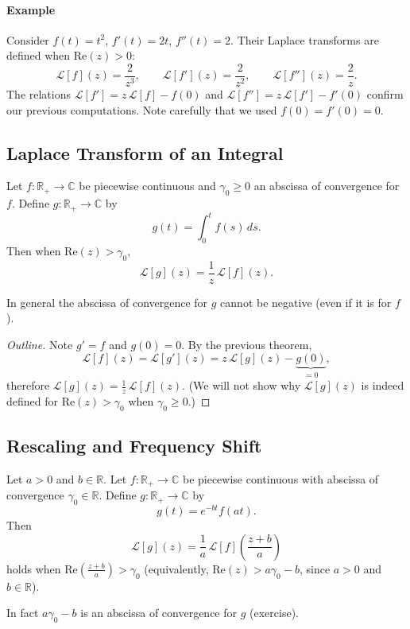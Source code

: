 \paragraph{Example}
\begin{example}
Consider $f(t) = t^2$, $f'(t) = 2t$, $f''(t) = 2$. Their Laplace transforms are defined when $\mathrm{Re}(z) > 0$:
\[
\mathcal{L}[f](z) = \frac{2}{z^3}, \qquad
\mathcal{L}[f'](z) = \frac{2}{z^2}, \qquad
\mathcal{L}[f''](z) = \frac{2}{z}.
\]
The relations $\mathcal{L}[f'] = z\,\mathcal{L}[f] - f(0)$ and $\mathcal{L}[f''] = z\,\mathcal{L}[f'] - f'(0)$ confirm our previous computations. Note carefully that we used $f(0) = f'(0) = 0$.
\end{example}

\subsection{Laplace Transform of an Integral}

\begin{theorem}
Let $f : \mathbb{R}_+ \to \mathbb{C}$ be piecewise continuous and $\gamma_0 \geq 0$ an abscissa of convergence for $f$. Define $g : \mathbb{R}_+ \to \mathbb{C}$ by
\[
g(t) = \int_0^t f(s)\,ds.
\]
Then when $\mathrm{Re}(z) > \gamma_0$,
\[
\boxed{\mathcal{L}[g](z) = \frac{1}{z}\,\mathcal{L}[f](z).}
\]
\end{theorem}

\begin{remark}
In general the abscissa of convergence for $g$ cannot be negative (even if it is for $f$).
\end{remark}

\begin{proof}[Outline]
Note $g' = f$ and $g(0) = 0$. By the previous theorem,
\[
\mathcal{L}[f](z) = \mathcal{L}[g'](z) = z\,\mathcal{L}[g](z) - \underbrace{g(0)}_{=0},
\]
therefore $\mathcal{L}[g](z) = \tfrac{1}{z}\,\mathcal{L}[f](z)$. (We will not show why $\mathcal{L}[g](z)$ is indeed defined for $\mathrm{Re}(z) > \gamma_0$ when $\gamma_0 \geq 0$.)
\end{proof}

\subsection{Rescaling and Frequency Shift}

\begin{theorem}
Let $a > 0$ and $b \in \mathbb{R}$. Let $f : \mathbb{R}_+ \to \mathbb{C}$ be piecewise continuous with abscissa of convergence $\gamma_0 \in \mathbb{R}$. Define $g : \mathbb{R}_+ \to \mathbb{C}$ by
\[
g(t) = e^{-bt} f(at).
\]
Then
\[
\boxed{\mathcal{L}[g](z) = \frac{1}{a}\,\mathcal{L}[f]\!\left(\frac{z + b}{a}\right)}
\]
holds when $\mathrm{Re}\!\left(\tfrac{z+b}{a}\right) > \gamma_0$ (equivalently, $\mathrm{Re}(z) > a\gamma_0 - b$, since $a > 0$ and $b \in \mathbb{R}$).

In fact $a\gamma_0 - b$ is an abscissa of convergence for $g$ (exercise).
\end{theorem}

